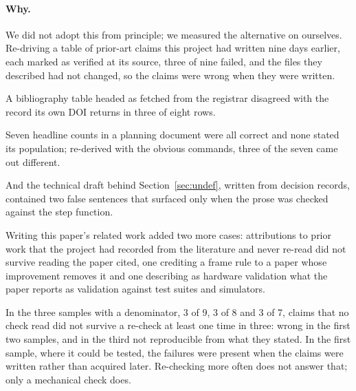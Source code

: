 \documentclass[runningheads]{llncs}
\newcommand{\src}[1]{}  %
\begin{document}
\paragraph{Why.}
We did not adopt this from principle; we measured the alternative on ourselves. Re-driving a table of
prior-art claims this project had written nine days earlier, each marked as verified at its source,
three of nine failed, and the files they described had not changed, so the claims were wrong when they
were written.
\src{docs/DECISIONS.md D201 1; docs/CLAIMS.tsv[recheck\_d201\_failed, recheck\_d201\_total]}
A bibliography table headed as fetched from the registrar disagreed with the record its own DOI returns
in three of eight rows.
\src{docs/DECISIONS.md D214; docs/CLAIMS.tsv[recheck\_d214\_failed, recheck\_d214\_total]}
Seven headline counts in a planning document were all correct and none stated its population;
re-derived with the obvious commands, three of the seven came out different.
\src{docs/DECISIONS.md D202; docs/CLAIMS.tsv[recheck\_d202\_failed, recheck\_d202\_total]}
And the technical draft behind Section~\ref{sec:undef}, written from decision records, contained two
false sentences that surfaced only when the prose was checked against the step function.
\src{docs/DECISIONS.md D213}
Writing this paper's related work added two more cases: attributions to prior work that the project
had recorded from the literature and never re-read did not survive reading the paper cited, one crediting
a frame rule to a paper whose improvement removes it and one describing as hardware validation what the
paper reports as validation against test suites and simulators.
\src{docs/DECISIONS.md D222 and D223. Not counted as a sample, and not in the rate below: the set they were
drawn from was not fixed before the reading, and D223's own record counts three corrections that evening
where this paragraph once counted two failures of three; docs/DECISIONS.md D235}
In the three samples with a denominator, 3 of 9, 3 of 8 and 3 of 7, claims that no check read did
not survive a re-check at least one time in three: wrong in the first two samples, and in the third not
reproducible from what they stated. In the first sample, where it could be tested, the failures were
present when the claims were written rather than acquired later.
Re-checking more often does not answer that; only a mechanical check does.
\src{docs/CLAIMS.tsv[recheck\_d201\_failed, recheck\_d201\_total, recheck\_d214\_failed, recheck\_d214\_total,
recheck\_d202\_failed, recheck\_d202\_total]; the draft of the undefined-behaviour section and the related-work cases have no denominator
and are not in the rate (D235)}
\end{document}
